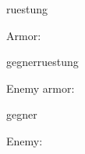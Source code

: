 \documentclass[12pt]{pnpprep}
\begin{document}
%
%
%


\begin{blueprint}{ruestung}

    \begin{render}
        Armor: \namevalue
    \end{render}
\end{blueprint}


\begin{blueprint}{gegnerruestung}

    \begin{render}
        Enemy armor: \namevalue
    \end{render}
\end{blueprint}


\begin{blueprint}{gegner}


    \begin{render}
        Enemy: \namevalue
        \par
        \renderChildren
    \end{render}
\end{blueprint}


\begin{gegner}

    \begin{ruestung}
    \end{ruestung}
\end{gegner}
\end{document}
